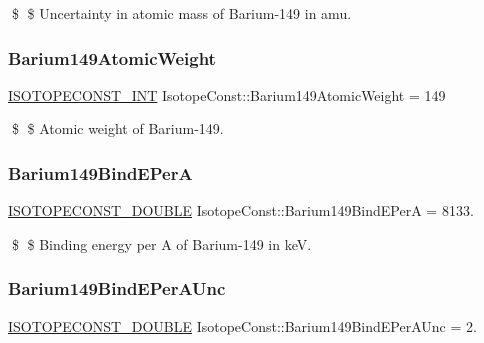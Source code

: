 \$ \$ Uncertainty in atomic mass of Barium-\/149 in amu. \mbox{\label{group___isotope_const-_barium-_ba149_gab0036e55fc2a0b03bb571995429ec1d9}} 
\subsubsection{\texorpdfstring{Barium149\+Atomic\+Weight}{Barium149AtomicWeight}}
{\footnotesize\ttfamily \mbox{\hyperlink{group___isotope_const-_macros_ga5f18360b3e99483a35c32d789e62621c}{I\+S\+O\+T\+O\+P\+E\+C\+O\+N\+S\+T\+\_\+\+I\+NT}} Isotope\+Const\+::\+Barium149\+Atomic\+Weight = 149}

\$ \$ Atomic weight of Barium-\/149. \mbox{\label{group___isotope_const-_barium-_ba149_gaf501f2757f893e47864c59f3aba3b4b6}} 
\subsubsection{\texorpdfstring{Barium149\+Bind\+E\+PerA}{Barium149BindEPerA}}
{\footnotesize\ttfamily \mbox{\hyperlink{group___isotope_const-_macros_ga8f45a7272ce02c0b4c65c44636ed719a}{I\+S\+O\+T\+O\+P\+E\+C\+O\+N\+S\+T\+\_\+\+D\+O\+U\+B\+LE}} Isotope\+Const\+::\+Barium149\+Bind\+E\+PerA = 8133.}

\$ \$ Binding energy per A of Barium-\/149 in keV. \mbox{\label{group___isotope_const-_barium-_ba149_ga0323626c87ec1731a17149bd8be33551}} 
\subsubsection{\texorpdfstring{Barium149\+Bind\+E\+Per\+A\+Unc}{Barium149BindEPerAUnc}}
{\footnotesize\ttfamily \mbox{\hyperlink{group___isotope_const-_macros_ga8f45a7272ce02c0b4c65c44636ed719a}{I\+S\+O\+T\+O\+P\+E\+C\+O\+N\+S\+T\+\_\+\+D\+O\+U\+B\+LE}} Isotope\+Const\+::\+Barium149\+Bind\+E\+Per\+A\+Unc = 2.}


